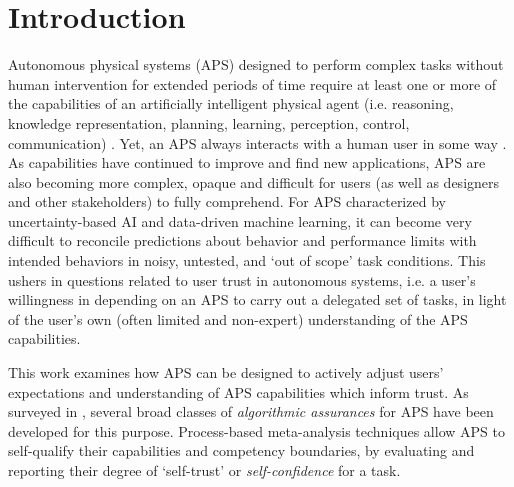 \section{Introduction}
Autonomous physical systems (APS) designed to perform complex tasks without human intervention for extended periods of time require at least one or more of the capabilities of an artificially intelligent physical agent (i.e. reasoning, knowledge representation, planning, learning, perception, control, communication) \cite{Israelsen2019-to}. 
Yet, an APS always interacts with a human user in some way \cite{Bradshaw2013-ck}.  
As capabilities have continued to improve and find new applications, APS are also becoming more complex, opaque and difficult for users (as well as designers and other stakeholders) to fully comprehend. For APS characterized by uncertainty-based AI and data-driven machine learning, it can become very difficult to reconcile predictions about behavior and performance limits with intended behaviors in noisy, untested, and `out of scope' task conditions. This ushers in questions related to user trust in autonomous systems, i.e. a user's willingness in depending on an APS to carry out a delegated set of tasks, in light of the user's own (often limited and non-expert) understanding of the APS capabilities. 

This work examines how APS can be designed to actively adjust users' expectations and understanding of APS capabilities which inform trust. As surveyed in \cite{Israelsen2019-to}, several broad classes of \emph{algorithmic assurances} for APS have been developed for this purpose. 
Process-based meta-analysis techniques allow APS to self-qualify their capabilities and competency boundaries, by evaluating and reporting their degree of `self-trust' or \emph{self-confidence} for a task. 

